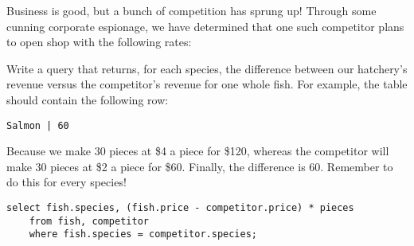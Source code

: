 \begin{blocksection}
\question Business is good, but a bunch of competition has sprung up! Through some cunning corporate espionage, we have determined that one such competitor plans to open shop with the following rates:

Write a query that returns, for each species, the difference between our hatchery's revenue versus the competitor's revenue for one whole fish. For example, the table should contain the following row:

\begin{lstlisting}
Salmon | 60
\end{lstlisting}

Because we make 30 pieces at \$4 a piece for \$120, whereas the competitor will make 30 pieces at \$2 a piece for \$60. Finally, the difference is 60. Remember to do this for every species!

\begin{solution}[1in]
\begin{lstlisting}
select fish.species, (fish.price - competitor.price) * pieces
    from fish, competitor
    where fish.species = competitor.species;
\end{lstlisting}
\end{solution}
\end{blocksection}
